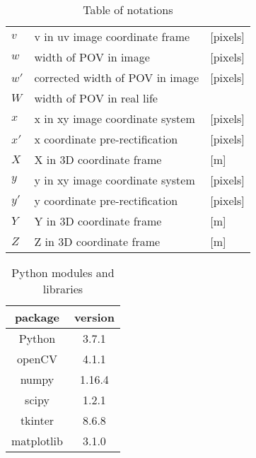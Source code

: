 \begin{table}[H]
\begin{tabular}{l|l|l}
         $v$ & v in uv image coordinate frame & [pixels] \\
         $w$ & width of POV in image & [pixels] \\
         $w'$ & corrected width of POV in image & [pixels] \\
         $W$ & width of POV in real life & \\
         $x$ & x in xy image coordinate system & [pixels] \\
         $x'$ & x coordinate pre-rectification & [pixels] \\
         $X$ & X in 3D coordinate frame & [m] \\
         $y$ & y in xy image coordinate system & [pixels] \\
         $y'$ & y coordinate pre-rectification & [pixels] \\
         $Y$ & Y in 3D coordinate frame & [m] \\
         $Z$ & Z in 3D coordinate frame & [m] \\
    \end{tabular}
    \caption{Table of notations}
    \label{tab:notations}
\end{table}


\begin{table}[H]
    \centering
    \begin{tabular}{c|c}
        package & version\\
        \hline
        Python & 3.7.1  \\
        openCV & 4.1.1 \\
        numpy & 1.16.4\\
        scipy & 1.2.1\\
        tkinter & 8.6.8\\
        matplotlib & 3.1.0\\
    \end{tabular}
    \caption{Python modules and libraries}
    \label{tab:python_modules}
\end{table}